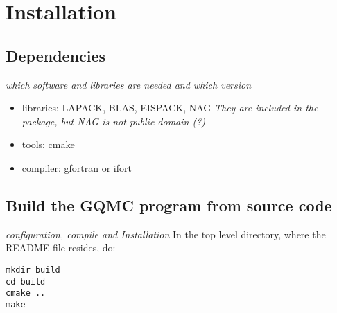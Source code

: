 \section{Installation}
\subsection{Dependencies}
\textit{which software and libraries are needed and which version}
\begin{itemize}
\item libraries: LAPACK, BLAS, EISPACK, NAG \textit{They are included in the package, but NAG is not  public-domain (?)}
\item tools: cmake
\item compiler: gfortran or ifort
\end{itemize}


\subsection{Build the GQMC program from source code}
\textit{configuration, compile and Installation}
In the top level directory, where the README file resides, do:
\begin{verbatim}
mkdir build
cd build
cmake ..
make
\end{verbatim}